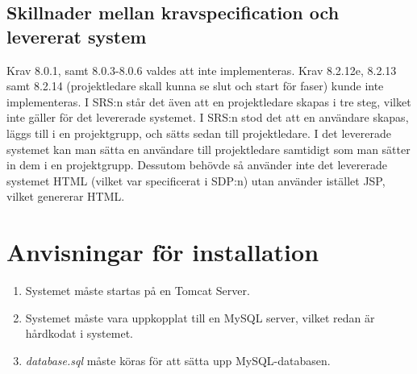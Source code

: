 \documentclass[paper=a4, fontsize=11pt,twoside]{article}
\begin{document}
\subsection{Skillnader mellan kravspecification och levererat system}
Krav 8.0.1, samt 8.0.3-8.0.6 valdes att inte implementeras. %
\flushleft
Krav 8.2.12e, 8.2.13 samt 8.2.14 (projektledare skall kunna se slut och start
för faser) kunde inte implementeras. I SRS:n står det även att en projektledare skapas i tre steg, vilket inte gäller för det levererade systemet. I SRS:n stod det att en användare skapas, läggs till i en projektgrupp, och sätts sedan till projektledare. I det levererade systemet kan man sätta en användare till projektledare samtidigt som man sätter in dem i en projektgrupp. Dessutom behövde så använder inte det levererade systemet HTML (vilket var specificerat i SDP:n) utan använder istället JSP, vilket genererar HTML.

\newpage
\section{Anvisningar för installation}
\begin{enumerate}
\item Systemet måste startas på en Tomcat Server.
\item Systemet måste vara uppkopplat till en MySQL server, vilket redan är
hårdkodat i systemet.
\item \textit{database.sql} måste köras för att sätta upp MySQL-databasen.
\end{enumerate}
\end{document}
